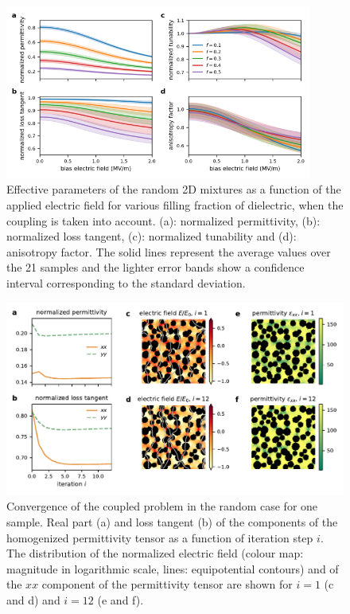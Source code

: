 \documentclass[aps,prb,11pt]{revtex4-1}
\begin{document}
\begin{figure}[!t]
 \centering
 \includegraphics[width=0.9\textwidth]{effpar_rand_cpl.png}
 \caption{Effective parameters of the random 2D mixtures as a function of the
  applied electric field for various filling fraction of dielectric, when the
  coupling is taken into account.
  (a): normalized permittivity, (b): normalized loss tangent, (c): normalized tunability and
  (d): anisotropy factor. The solid lines represent the average values
  over the 21 samples and the lighter error bands show a confidence interval corresponding to
  the standard deviation.}
 \label{eff_par_2Drand_TM}
\end{figure}
%
%
%
\begin{figure}[!t]
 \centering
 \includegraphics[width=1\textwidth]{convergence_rand}
 \caption{Convergence of the coupled problem in the random case
  for one sample.
  Real part (a) and loss tangent (b) of the components of the homogenized
  permittivity tensor as a function of iteration step $i$. The distribution of
  the normalized electric field (colour map: magnitude in logarithmic scale,
  lines: equipotential contours) and of the $xx$ component of the permittivity tensor are shown for $i=1$
  (c and d) and $i=12$ (e and f).
 }
 \label{conv_random}
\end{figure}
\end{document}
